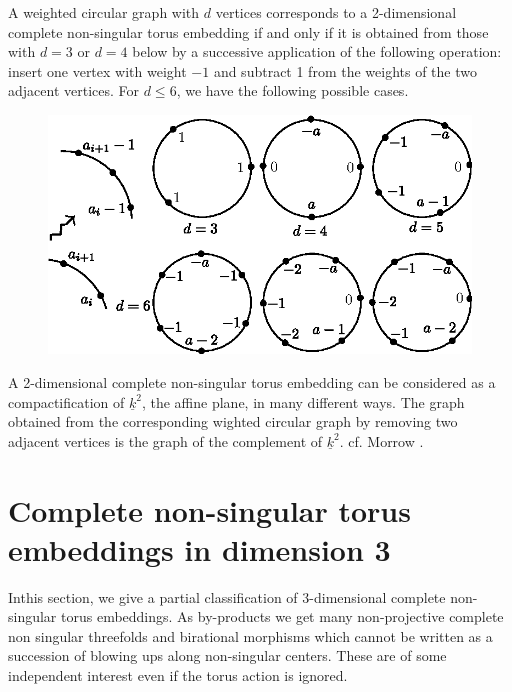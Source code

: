 \setcounter{coro}{4}
\begin{coro}\label{chap1:coro8.5}%
A weighted circular graph with  $d$ vertices corresponds to a
2-dimensional complete non-singular torus embedding if  and only if
it is  obtained from those with $d=3$ or $d=4$ below by a successive
application of the  following  operation: insert  one  vertex with
weight $-1$ and subtract 1 from the  weights of the two adjacent
vertices. For $d \leq 6$, we have the following possible cases. 
\end{coro}
\begin{figure}[H]
\centering 
\includegraphics{vol58-fig/fig58-19.eps} 
\end{figure}\pageoriginale


\begin{remark*}
 A 2-dimensional complete non-singular torus embedding can be
  considered as a compactification of $\underline{k}^2$, the affine
  plane, in many different ways. The graph obtained  from the
  corresponding wighted circular graph by removing two adjacent
  vertices is the graph of the complement of
  $\underline{k}^2$. cf. Morrow \cite{keyM6}. 
\end{remark*}

\section{Complete  non-singular torus embeddings in dimension
  3}\label{chap1:sec9}

In\pageoriginale this section, we give a partial classification of
$3$-dimensional 
complete non-singular torus embeddings. As by-products we get many
non-projective  complete non singular threefolds and  birational
morphisms which cannot be written as a succession of  blowing ups
along non-singular centers. These are  of some independent interest
even if the torus action is ignored. 

